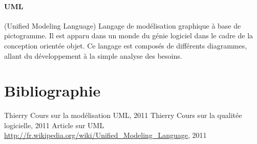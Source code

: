 \documentclass[12pt,a4paper,openany]{article}
\begin{document}
	\paragraph{UML} (Unified Modeling Language) Langage de modélisation graphique à base de pictogramme. Il est apparu dans un monde du génie logiciel dans le cadre de la conception orientée objet. Ce langage est composés de différents diagrammes, allant du développement à la simple analyse des besoins. 
\section{Bibliographie}
\begin{thebibliography}{1}
	 Thierry  Cours sur la modélisation UML, 2011 
	 Thierry  Cours sur la qualitée logicielle, 2011 
	 Article sur UML \url{http://fr.wikipedia.org/wiki/Unified_Modeling_Language}, 2011 
\end{thebibliography}
\end{document}
